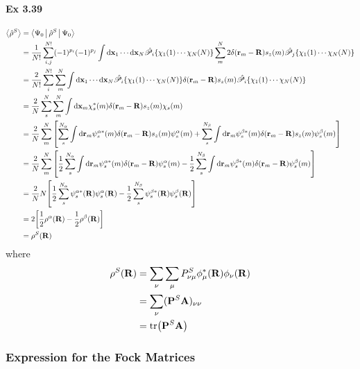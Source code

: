 \documentclass[a4paper]{article}
\newcommand{\hsP}{\hat{\mathscr{P}}}
\newcommand{\ex}[1]{\paragraph{Ex #1}}
\numberwithin{equation}{subsection}
\begin{document}
\ex{3.39}
\begin{align}
\ev{\hat\rho^S} &= \Braket{\Psi_0 | \hat\rho^S | \Psi_0} \notag\\
&= \dfrac{1}{N!}\sum_{i,j}^{N!} (-1)^{p_i}(-1)^{p_j} \int\dd\vb{x}_1\cdots\dd\vb{x}_N \hsP_i\{\chi_1(1)\cdots\chi_N(N)\} \sum_m^N 2\delta(\vb{r}_m - \vb{R})s_z(m) \hsP_j\{\chi_1(1)\cdots\chi_N(N)\} \notag\\
&= \dfrac{2}{N!}\sum_{i}^{N!} \sum_m^N  \int\dd\vb{x}_1\cdots\dd\vb{x}_N \hsP_i\{\chi_1(1)\cdots\chi_N(N)\} \delta(\vb{r}_m - \vb{R})s_z(m) \hsP_i\{\chi_1(1)\cdots\chi_N(N)\} \notag\\
&= \dfrac{2}{N}\sum_{s}^{N} \sum_m^N  \int\dd\vb{x}_m \chi_s^*(m) \delta(\vb{r}_m - \vb{R})s_z(m) \chi_s(m) \notag\\
&= \dfrac{2}{N}\sum_m^N  \qty[ \sum_{s}^{N_\alpha} \int\dd\vb{r}_m \psi_s^{\alpha*}(m) \delta(\vb{r}_m - \vb{R})s_z(m) \psi_s^\alpha(m) 
+ \sum_{s}^{N_\beta} \int\dd\vb{r}_m \psi_s^{\beta*}(m) \delta(\vb{r}_m - \vb{R})s_z(m) \psi_s^\beta(m) ] \notag\\
&= \dfrac{2}{N}\sum_m^N  \qty[ \dfrac{1}{2}\sum_{s}^{N_\alpha} \int\dd\vb{r}_m \psi_s^{\alpha*}(m) \delta(\vb{r}_m - \vb{R}) \psi_s^\alpha(m) 
- \dfrac{1}{2}\sum_{s}^{N_\beta} \int\dd\vb{r}_m \psi_s^{\beta*}(m) \delta(\vb{r}_m - \vb{R}) \psi_s^\beta(m) ] \notag\\
&= \dfrac{2}{N}N  \qty[ \dfrac{1}{2}\sum_{s}^{N_\alpha} \psi_s^{\alpha*}(\vb{R})\psi_s^\alpha(\vb{R}) 
- \dfrac{1}{2}\sum_{s}^{N_\beta} \psi_s^{\beta*}(\vb{R})\psi_s^\beta(\vb{R}) ] \notag\\
&= 2 \qty[ \dfrac{1}{2} \rho^\alpha(\vb{R}) 
- \dfrac{1}{2}\rho^\beta(\vb{R}) ] \notag\\
&= \rho^S(\vb{R})
\end{align}
where
\begin{align}
\rho^S(\vb{R}) &= \sum_\nu\sum_\mu P^S_{\nu\mu} \phi_\mu^*(\vb{R})\phi_\nu(\vb{R}) \notag\\
&= \sum_\nu (\vb{P}^S\vb{A})_{\nu\nu} \notag\\
&= \tr(\vb{P}^S\vb{A})
\end{align}

\subsubsection{Expression for the Fock Matrices}
\end{document}
